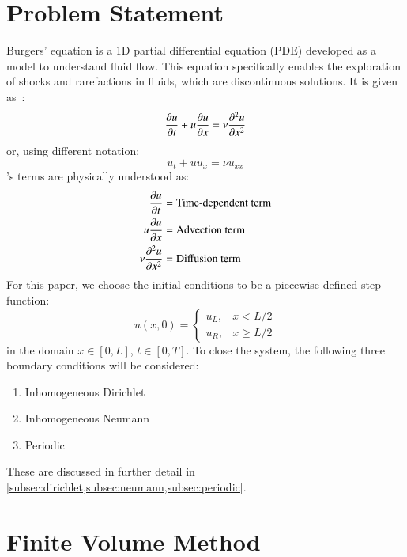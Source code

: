\documentclass[ltr]{ornltm} %
\numberwithin{equation}{section}
\begin{document}
	\section{Problem Statement} \label{sec:problem-statement}
	Burgers' equation is a 1D partial differential equation (PDE) developed as a model to understand fluid flow.
	This equation specifically enables the exploration of shocks and rarefactions in fluids, which are discontinuous solutions.
	It is given as~\autocite{salihBurgersEquation2016}:
	\begin{equation}
		\label{eq:burgers-equation}
		\pdv{u}{t} + u\pdv{u}{x} = \nu \pdv[2]{u}{x}
	\end{equation}
	or, using different notation:
	\begin{equation}
		\label{eq:alternate-burgers-equation}
		u_t + uu_x=\nu u_{xx}
	\end{equation}
	's terms are physically understood as:
	\begin{equation*}
		\begin{split}
			\pdv{u}{t}&=\text{Time-dependent term}\\
			u\pdv{u}{x}&=\text{Advection term}\\
			\nu \pdv[2]{u}{x}&=\text{Diffusion term}
		\end{split}
	\end{equation*}
	For this paper, we choose the initial conditions to be a piecewise-defined step function:
	\begin{equation}
		\label{eq:initial-condition}
		u(x,0)=\begin{cases}
				   u_L, & x<L/2\\
				   u_R, & x\geq L/2
		\end{cases}
	\end{equation}
	in the domain $x\in [0,L]$, $t\in[0,T]$.
	To close the system, the following three boundary conditions will be considered:
	\begin{enumerate}
		\item Inhomogeneous Dirichlet
		\item Inhomogeneous Neumann
		\item Periodic
	\end{enumerate}
	These are discussed in further detail in \cref{subsec:dirichlet,subsec:neumann,subsec:periodic}.


	\section{Finite Volume Method}\label{sec:finite-volume-method}
	
\end{document}
